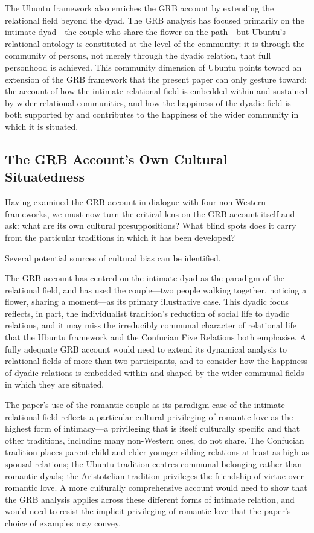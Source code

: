The Ubuntu framework also enriches the GRB account by extending the relational field beyond the dyad. The GRB analysis has focused primarily on the intimate dyad---the couple who share the flower on the path---but Ubuntu's relational ontology is constituted at the level of the community: it is through the community of persons, not merely through the dyadic relation, that full personhood is achieved. This community dimension of Ubuntu points toward an extension of the GRB framework that the present paper can only gesture toward: the account of how the intimate relational field is embedded within and sustained by wider relational communities, and how the happiness of the dyadic field is both supported by and contributes to the happiness of the wider community in which it is situated.

\subsection{The GRB Account's Own Cultural Situatedness}
\label{p14:subsec:culturalself}

\noindent
Having examined the GRB account in dialogue with four non-Western frameworks, we must now turn the critical lens on the GRB account itself and ask: what are its own cultural presuppositions? What blind spots does it carry from the particular traditions in which it has been developed?

Several potential sources of cultural bias can be identified.

 The GRB account has centred on the intimate dyad as the paradigm of the relational field, and has used the couple---two people walking together, noticing a flower, sharing a moment---as its primary illustrative case. This dyadic focus reflects, in part, the individualist tradition's reduction of social life to dyadic relations, and it may miss the irreducibly communal character of relational life that the Ubuntu framework and the Confucian Five Relations both emphasise. A fully adequate GRB account would need to extend its dynamical analysis to relational fields of more than two participants, and to consider how the happiness of dyadic relations is embedded within and shaped by the wider communal fields in which they are situated.

 The paper's use of the romantic couple as its paradigm case of the intimate relational field reflects a particular cultural privileging of romantic love as the highest form of intimacy---a privileging that is itself culturally specific and that other traditions, including many non-Western ones, do not share. The Confucian tradition places parent-child and elder-younger sibling relations at least as high as spousal relations; the Ubuntu tradition centres communal belonging rather than romantic dyads; the Aristotelian tradition privileges the friendship of virtue over romantic love. A more culturally comprehensive account would need to show that the GRB analysis applies across these different forms of intimate relation, and would need to resist the implicit privileging of romantic love that the paper's choice of examples may convey.

